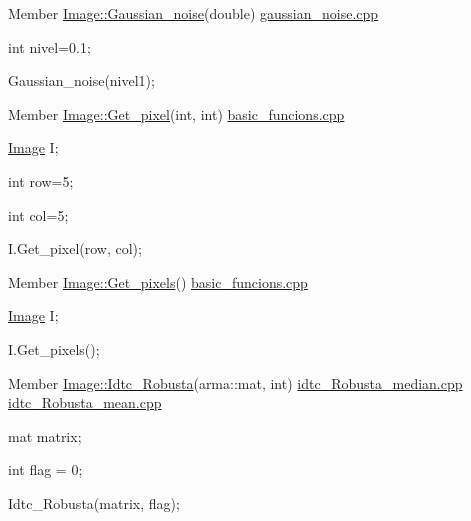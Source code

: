 \label{test__test000009}
\hypertarget{test__test000009}{}
 
\begin{DoxyDescription}
\item[Member \hyperlink{classImage_a61630c07f6e608502bb6f7656cb154d7}{Image::Gaussian\_\-noise}(double) ]\hyperlink{gaussian__noise_8cpp}{gaussian\_\-noise.cpp} \par
 int nivel=0.1; \par
 Gaussian\_\-noise(nivel1); 
\end{DoxyDescription}

\label{test__test000007}
\hypertarget{test__test000007}{}
 
\begin{DoxyDescription}
\item[Member \hyperlink{classImage_aa86aeeebf3fdc0a1a7d298e6162bca7d}{Image::Get\_\-pixel}(int, int) ]\hyperlink{basic__funcions_8cpp}{basic\_\-funcions.cpp} \par
 \hyperlink{classImage}{Image} I; \par
 int row=5; \par
 int col=5; \par
 I.Get\_\-pixel(row, col); 
\end{DoxyDescription}

\label{test__test000008}
\hypertarget{test__test000008}{}
 
\begin{DoxyDescription}
\item[Member \hyperlink{classImage_a23162a663c28406dcf254696076ec204}{Image::Get\_\-pixels}() ]\hyperlink{basic__funcions_8cpp}{basic\_\-funcions.cpp} \par
 \hyperlink{classImage}{Image} I; \par
 I.Get\_\-pixels(); 
\end{DoxyDescription}

\label{test__test000020}
\hypertarget{test__test000020}{}
 
\begin{DoxyDescription}
\item[Member \hyperlink{classImage_ac18f2333604b1fff1c27ba8463fce0c1}{Image::Idtc\_\-Robusta}(arma::mat, int) ]\hyperlink{idtc__Robusta__median_8cpp}{idtc\_\-Robusta\_\-median.cpp} \hyperlink{idtc__Robusta__mean_8cpp}{idtc\_\-Robusta\_\-mean.cpp} \par
 mat matrix; \par
 int flag = 0; \par
 Idtc\_\-Robusta(matrix, flag); 
\end{DoxyDescription}

